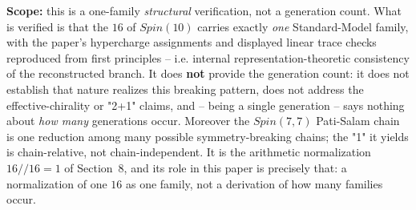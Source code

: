 \documentclass[11pt]{article}
\theoremstyle{remark}
\begin{document}
\textbf{Scope:} this is a one-family \emph{structural} verification, not a generation count. What is verified is that the $16$ of $Spin(10)$ carries exactly \emph{one} Standard-Model family, with the paper's hypercharge assignments and displayed linear trace checks reproduced from first principles -- i.e. internal representation-theoretic consistency of the reconstructed branch. It does \textbf{not} provide the generation count: it does not establish that nature realizes this breaking pattern, does not address the effective-chirality or "2+1" claims, and -- being a single generation -- says nothing about \emph{how many} generations occur. Moreover the $Spin(7,7)$ Pati-Salam chain is one reduction among many possible symmetry-breaking chains; the "1" it yields is chain-relative, not chain-independent. It is the arithmetic normalization $16 // 16 = 1$ of Section~8, and its role in this paper is precisely that: a normalization of one $16$ as one family, not a derivation of how many families occur.
\end{document}
